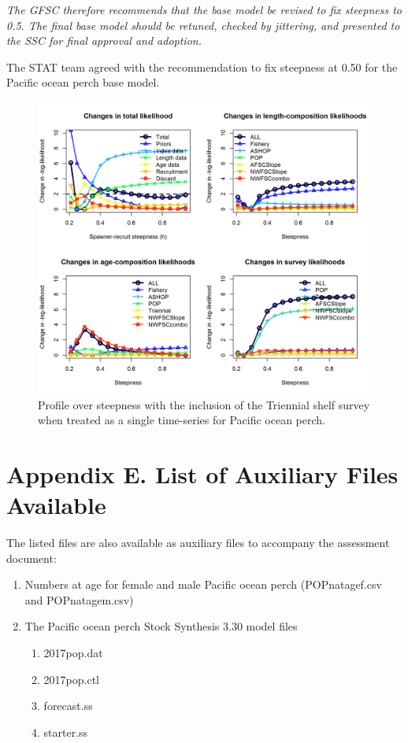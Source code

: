 \documentclass[12pt,]{article}
\begin{document}
\emph{The GFSC therefore recommends that the base model be revised to
fix steepness to 0.5. The final base model should be retuned, checked by
jittering, and presented to the SSC for final approval and adoption.}

The STAT team agreed with the recommendation to fix steepness at 0.50
for the Pacific ocean perch base model.

\begin{figure}
\centering
\includegraphics{Figures/triennial_piner_panel_h.png}
\caption{Profile over steepness with the inclusion of the Triennial
shelf survey when treated as a single time-series for Pacific ocean
perch. \label{fig:Tri_Profile}}
\end{figure}

\FloatBarrier

\section{Appendix E. List of Auxiliary Files
Available}\label{appendix-e.-list-of-auxiliary-files-available}

The listed files are also available as auxiliary files to accompany the
assessment document:

\begin{enumerate}
  \item Numbers at age for female and male Pacific ocean perch (POPnatagef.csv and POPnatagem.csv)
  \item The Pacific ocean perch Stock Synthesis 3.30 model files
  
  \begin{enumerate}
    \item 2017pop.dat
    \item 2017pop.ctl
    \item forecast.ss
    \item starter.ss
  \end{enumerate}
\end{enumerate}
\end{document}
